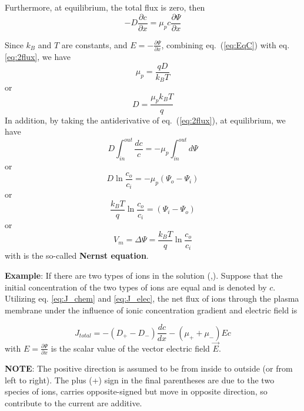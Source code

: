 Furthermore, at equilibrium, the total flux is zero, then
\begin{equation}\label{eq:2flux}
  -D \frac{\partial c}{\partial x} = \mu_p c \frac{\partial
    \Psi}{\partial x}
\end{equation}

Since $k_B$ and $T$ are constants, and $E=-
\frac{\partial \Psi}{\partial x}$, combining eq.~(\ref{eq:EqC}) with
eq.\eqref{eq:2flux}, we have
\begin{equation}
  \mu_p = \frac{qD}{k_BT}
\end{equation}
or
\begin{equation}
  \label{eq:134}
  D = \frac{\mu_p k_BT}{q}
\end{equation}
In addition, by taking the antiderivative of eq.~(\ref{eq:2flux}), at
equilibrium, we have
\begin{equation}
  \label{eq:210}
    D \int_{in}^{out}\frac{dc}{c} = -\mu_p \int_{in}^{out}d\Psi
\end{equation}
or
\begin{equation}
  \label{eq:211}
  D \ln\frac{c_o}{c_i} = -\mu_p(\Psi_o-\Psi_i)
\end{equation}
or
\begin{equation}
  \label{eq:212}
  \frac{k_BT}{q} \ln\frac{c_o}{c_i} = (\Psi_i-\Psi_o) 
\end{equation}
or
\begin{equation}
  \label{eq:213}
  V_m = \Delta \Psi =   \frac{k_BT}{q} \ln\frac{c_o}{c_i} 
\end{equation}
with is the so-called {\bf Nernst equation}.

{\bf Example}: If there are two types of ions in the solution
(,).  Suppose that the initial concentration of the
two types of ions are equal and is denoted by $c$. Utilizing
eq. \eqref{eq:J_chem} and \eqref{eq:J_elec}, the net flux of ions
through the plasma membrane under the influence of ionic concentration
gradient and electric field is

\begin{equation}
  \label{eq:92}
    J_{total} = -(D_+-D_-) \frac{dc}{dx} - (\mu_++\mu_-) Ec
\end{equation}
with $E=\frac{\partial \Psi}{\partial x}$ is the scalar value of the
vector electric field $\vec{E}$.

{\bf NOTE}: The positive direction is assumed to be from inside to
outside (or from left to right). The plus (+) sign in the final
parentheses are due to the two species of ions, carries
opposite-signed but move in opposite direction, so contribute to the
current are additive.

